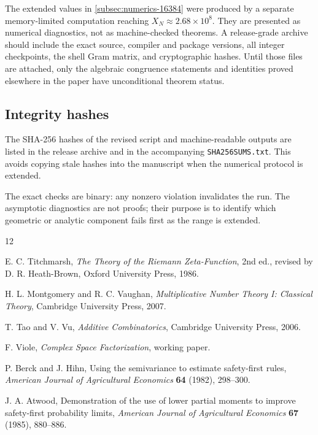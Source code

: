 \documentclass[11pt]{article}
\theoremstyle{definition}
\theoremstyle{remark}
\newcommand{\1}{\mathbf{1}}
\begin{document}
The extended values in \cref{subsec:numerics-16384} were produced by a separate
memory-limited computation reaching $X_N\approx2.68\times10^8$.  They are presented
as numerical diagnostics, not as machine-checked theorems.  A release-grade archive
should include the exact source, compiler and package versions, all integer
checkpoints, the shell Gram matrix, and cryptographic hashes.  Until those files are
attached, only the algebraic congruence statements and identities proved elsewhere
in the paper have unconditional theorem status.

\subsection{Integrity hashes}

The SHA-256 hashes of the revised script and machine-readable outputs
are listed in the release archive and in the accompanying
\texttt{SHA256SUMS.txt}.  This avoids copying stale hashes into the
manuscript when the numerical protocol is extended.

The exact checks are binary: any nonzero violation invalidates the run.
The asymptotic diagnostics are not proofs; their purpose is to identify
which geometric or analytic component fails first as the range is
extended.

\begin{thebibliography}{12}

E. C. Titchmarsh,
\emph{The Theory of the Riemann Zeta-Function},
2nd ed., revised by D. R. Heath-Brown,
Oxford University Press, 1986.

H. L. Montgomery and R. C. Vaughan,
\emph{Multiplicative Number Theory I: Classical Theory},
Cambridge University Press, 2007.

T. Tao and V. Vu,
\emph{Additive Combinatorics},
Cambridge University Press, 2006.

F. Viole,
\emph{Complex Space Factorization},
working paper.

P. Berck and J. Hihn,
Using the semivariance to estimate safety-first rules,
\emph{American Journal of Agricultural Economics} \textbf{64} (1982), 298--300.

J. A. Atwood,
Demonstration of the use of lower partial moments to improve safety-first probability limits,
\emph{American Journal of Agricultural Economics} \textbf{67} (1985), 880--886.

\end{thebibliography}
\end{document}
